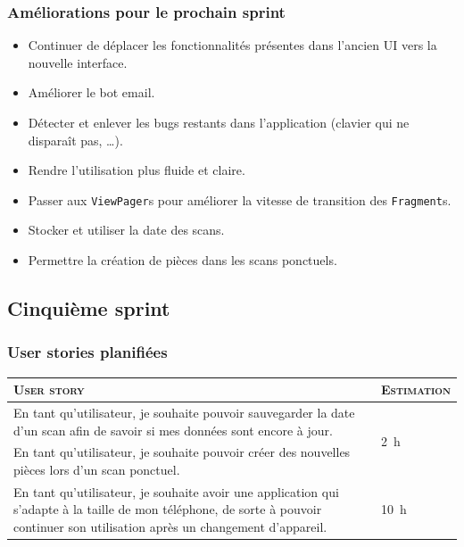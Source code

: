 \documentclass{elsarticle}
\newcommand{\est}[1]{\multirow{2}{*}{\SI{#1}{\hour}}}
\newcommand{\estbis}[1]{\SI{#1}{\hour}}
\begin{document}
\subsubsection{Améliorations pour le prochain sprint}
\begin{itemize}
	\item Continuer de déplacer les fonctionnalités présentes dans l'ancien UI vers la nouvelle interface.
	\item Améliorer le bot email.
	\item Détecter et enlever les bugs restants dans l'application (clavier qui ne disparaît pas, \ldots).
	\item Rendre l'utilisation plus fluide et claire.
	\item Passer aux \texttt{ViewPager}s pour améliorer la vitesse de transition des \texttt{Fragment}s.
	\item Stocker et utiliser la date des scans.
	\item Permettre la création de pièces dans les scans ponctuels.
\end{itemize}

\subsection{Cinquième sprint}
\subsubsection{User stories planifiées}
\begin{table}[H]
\centering
\begin{tabular}{p{14cm}m{2cm}}
	\toprule
	\textsc{User story} & \textsc{Estimation}\\
	\midrule
	En tant qu'utilisateur, je souhaite pouvoir sauvegarder la date d'un scan afin de savoir si mes données sont encore à jour. & \est{2}\\
	\midrule
	En tant qu'utilisateur, je souhaite pouvoir créer des nouvelles pièces lors d'un scan ponctuel. & \estbis{5}\\
	\midrule
	En tant qu'utilisateur, je souhaite avoir une application qui s'adapte à la taille de mon téléphone, de sorte à pouvoir continuer son utilisation après un changement d'appareil. & \est{10}\\
	\bottomrule
\end{tabular}
\end{table}
\end{document}
